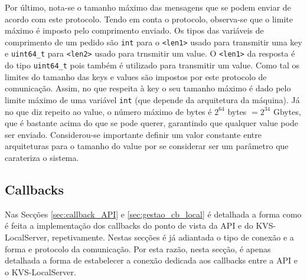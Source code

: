 Por último, nota-se o tamanho máximo das mensagens que se podem enviar de acordo com este protocolo. Tendo em conta o protocolo, observa-se que o limite máximo é imposto pelo comprimento enviado. Os tipos das variáveis de comprimento de um pedido são \texttt{int} para o \texttt{<len1>} usado para transmitir uma key e \texttt{uint64\_t} para \texttt{<len2>} usado para trnsmitir um value. O \texttt{<len1>} da resposta é do tipo \texttt{uint64\_t} pois também é utilizado para transmitir um value. Como tal os limites do tamanho das keys e values são impostos por este protocolo de comunicação.  Assim, no que respeita à key o seu tamanho máximo é dado pelo limite máximo de uma variável \texttt{int} (que depende da arquitetura da máquina). Já no que diz repeito ao value, o número máximo de bytes é $2^{64}$ bytes $=2^{34}$ Gbytes, que é bastante acima do que se pode querer, garantindo que qualquer value pode ser enviado. Considerou-se importante definir um valor constante entre arquiteturas para o tamanho do value por se considerar ser um parâmetro que carateriza o sistema.


\subsection{Callbacks}\label{com:cb}

Nas Secções \ref{sec:callback_API} e \ref{sec:gestao_cb_local} é detalhada a forma como é feita a implementação dos callbacks do ponto de vista da API e do KVS-LocalServer, repetivamente. Nestas secções é já adiantada o tipo de conexão e a forma e protocolo da comunicação. Por esta razão, nesta secção, é apenas detalhada a forma de estabelecer a conexão dedicada aos callbacks entre a API e o KVS-LocalServer. 

